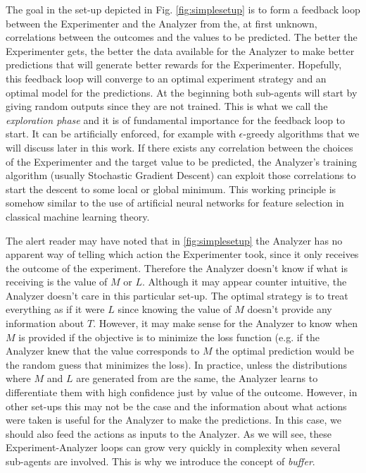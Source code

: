 \documentclass[11pt,a4paper,twoside]{report}
\newcommand{\+}{\textnormal{+} }
\theoremstyle{definition}
\numberwithin{equation}{chapter}
\begin{document}
The goal in the set-up depicted in Fig. \ref{fig:simplesetup} is to form a
feedback loop between the Experimenter and the Analyzer from the, at first
unknown, correlations between the outcomes and the values to be predicted. The
better the Experimenter gets, the better the data available for the Analyzer to
make better predictions that will generate better rewards for the Experimenter.
Hopefully, this feedback loop will converge to an optimal experiment strategy
and an optimal model for the predictions. At the beginning both sub-agents will
start by giving random outputs since they are not trained. This is what we call
the \textit{exploration phase} and it is of fundamental importance for the
feedback loop to start. It can be artificially enforced, for example with
$\epsilon$-greedy algorithms that we will discuss later in this work. If there
exists any correlation between the choices of the Experimenter and the target
value to be predicted, the Analyzer's training algorithm (usually Stochastic
Gradient Descent) can exploit those correlations to start the descent to some
local or global minimum. This working principle is somehow similar to the use of
artificial neural networks for feature selection in classical machine learning
theory.

The alert reader may have noted that in \ref{fig:simplesetup} the Analyzer has
no apparent way of telling which action the Experimenter took, since it only
receives the outcome of the experiment. Therefore the Analyzer doesn't know if
what is receiving is the value of $M$ or $L$. Although it may appear counter
intuitive, the Analyzer doesn't care in this particular set-up. The optimal
strategy is to treat everything as if it were $L$ since knowing the value of $M$
doesn't provide any information about $T$. However, it may make sense for the
Analyzer to know when $M$ is provided if the objective is to minimize the loss
function (e.g. if the Analyzer knew that the value corresponds to $M$ the
optimal prediction would be the random guess that minimizes the loss). In
practice, unless the distributions where $M$ and $L$ are generated from are the
same, the Analyzer learns to differentiate them with high confidence just by
value of the outcome. However, in other set-ups this may not be the case and the
information about what actions were taken is useful for the Analyzer to make
the predictions. In this case, we should also feed the actions as inputs to the
Analyzer. As we will see, these Experiment-Analyzer loops can grow very quickly
in complexity when several sub-agents are involved. This is why we
introduce the concept of \textit{buffer}.
\end{document}
